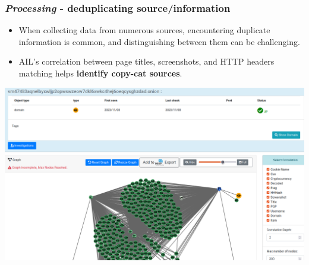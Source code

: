 \documentclass{beamer}
\begin{document}
\begin{frame}
   \frametitle{{\it Processing} - deduplicating source/information}
    \begin{itemize}
    \item When collecting data from numerous sources, encountering duplicate information is common, and distinguishing between them can be challenging.
    \item AIL's correlation between page titles, screenshots, and HTTP headers matching helps {\bf identify copy-cat sources}.
\end{itemize} 
    \begin{center}
        \includegraphics[scale=0.15]{images/ail-deduplicating.png}
   \end{center}
\end{frame}
\end{document}
